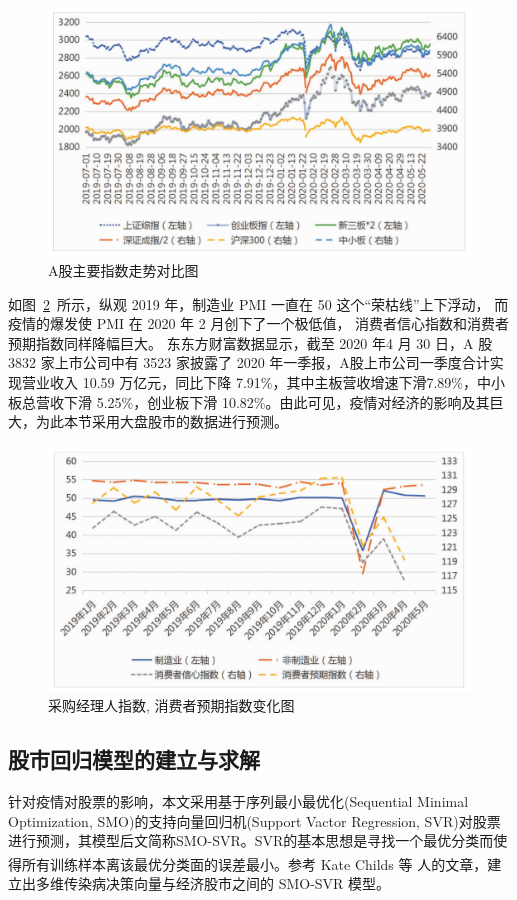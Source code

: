 \documentclass{whutmod}
\newcommand{\upcite}[1]{\textsuperscript{\cite{#1}}}
\begin{document}
			\begin{figure}[H]
				\centering
				\includegraphics[width=.8\textwidth]{figures/A1.png}
				\caption{A股主要指数走势对比图}\label{lssssssct}
			\end{figure}


如图~\ref{lssssdddssct}~所示，纵观 2019 年，制造业 PMI 一直在 50 这个“荣枯线”上下浮动， 而疫情的爆发使 PMI 在 2020 年 2 月创下了一个极低值， 消费者信心指数和消费者预期指数同样降幅巨大。 东东方财富数据显示，截至 2020 年4 月 30 日，A 股 3832 家上市公司中有 3523 家披露了 2020 年一季报，A股上市公司一季度合计实现营业收入 10.59 万亿元，同比下降 7.91\%，其中主板营收增速下滑7.89\%，中小板总营收下滑 5.25\%，创业板下滑 10.82\%。由此可见，疫情对经济的影响及其巨大，为此本节采用大盘股市的数据进行预测。

		\begin{figure}[H]
	\centering
	\includegraphics[width=.8\textwidth]{figures/A2.png}
	\caption{采购经理人指数, 消费者预期指数变化图}
	\label{lssssdddssct}
\end{figure}
		\subsection{股市回归模型的建立与求解}
		针对疫情对股票的影响，本文采用基于序列最小最优化(Sequential Minimal Optimization, SMO)的支持向量回归机(Support Vactor Regression, SVR)对股票进行预测，其模型后文简称SMO-SVR。SVR的基本思想是寻找一个最优分类而使得所有训练样本离该最优分类面的误差最小。参考 Kate Childs 等 人的文章\upcite{5}，建立出多维传染病决策向量与经济股市之间的 SMO-SVR 模型。
\end{document}
